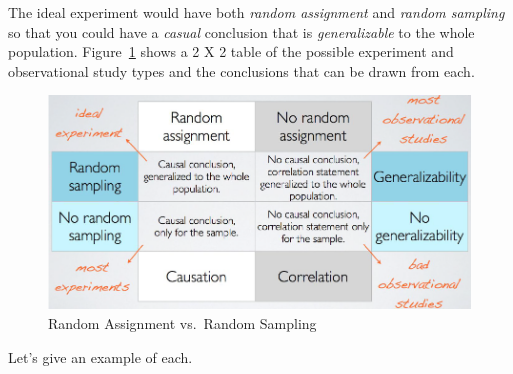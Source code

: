 \documentclass[
  letterpaper,
  DIV=11,
  numbers=noendperiod]{scrreprt}
\theoremstyle{definition}
\theoremstyle{remark}
\begin{document}
The ideal experiment would have both \emph{random assignment} and
\emph{random sampling} so that you could have a \emph{casual} conclusion
that is \emph{generalizable} to the whole population.
Figure~\ref{fig-RA-RS} shows a 2 X 2 table of the possible experiment
and observational study types and the conclusions that can be drawn from
each.

\begin{figure}

{\centering \includegraphics[width=1.1\textwidth,height=\textheight]{images/RA_vs_RS.png}

}

\caption{\label{fig-RA-RS}Random Assignment vs.~Random Sampling}

\end{figure}

Let's give an example of each.
\end{document}
